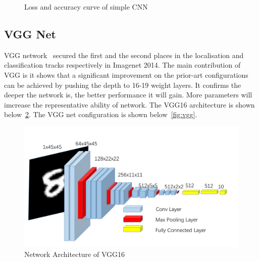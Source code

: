 \documentclass{article}
\begin{document}
\begin{figure}[!htb]
	\centering
{}
\caption{Loss and accuracy curve of simple CNN}
\label{fig:simplecnn-curve}
\end{figure}


\subsection{VGG Net}

VGG network~\cite{simonyan2014very} secured the first and the second places in the localisation 
and classification tracks respectively in Imagenet 2014. The main contribution of VGG is it shows that a significant improvement on the prior-art configurations can be achieved by pushing the depth to 16-19 weight layers. It confirms the deeper the network is, the better performance it will gain. More parameters will imcrease the representative ability of network.  The VGG16 architecture is shown below~\ref{fig:vgg16}. The VGG net configuration is shown below~\ref{fig:vgg}.

\begin{figure}[!htb]
	\centering\includegraphics[width=1.0\textwidth]{fig/vgg16.png}
	\caption{Network Architecture of  VGG16}\label{fig:vgg16}
\end{figure}
\end{document}
